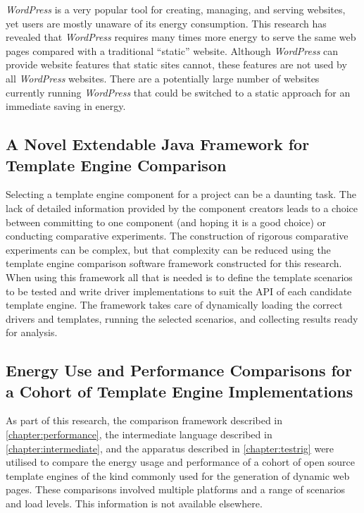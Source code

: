 \emph{WordPress} is a very popular tool for creating, managing, and serving websites, yet users are mostly unaware of its energy consumption. This research has revealed that \emph{WordPress} requires many times more energy to serve the same web pages compared with a traditional \enquote{static} website. Although \emph{WordPress} can provide website features that static sites cannot, these features are not used by all \emph{WordPress} websites. There are a potentially large number of websites currently running \emph{WordPress} that could be switched to a static approach for an immediate saving in energy.

\subsection{A Novel Extendable Java Framework for Template Engine Comparison}
\label{contrib:framework}

Selecting a \gls{template engine} component for a project can be a daunting task. The lack of detailed information provided by the component creators leads to a choice between committing to one component (and hoping it is a good choice) or conducting comparative experiments. The construction of rigorous comparative experiments can be complex, but that complexity can be reduced using the \gls{template engine} comparison software framework constructed for this research. When using this framework all that is needed is to define the template scenarios to be tested and write driver implementations to suit the API of each candidate \gls{template engine}. The framework takes care of dynamically loading the correct drivers and templates, running the selected scenarios, and collecting results ready for analysis.

\subsection{Energy Use and Performance Comparisons for a Cohort of Template Engine Implementations}
\label{contrib:engines}

As part of this research, the comparison framework described in \autoref{chapter:performance}, the intermediate language described in \autoref{chapter:intermediate}, and the apparatus described in \autoref{chapter:testrig} were utilised to compare the energy usage and performance of a cohort of open source \gls{template engine}s of the kind commonly used for the generation of dynamic web pages. These comparisons involved multiple platforms and a range of scenarios and load levels. This information is not available elsewhere.


